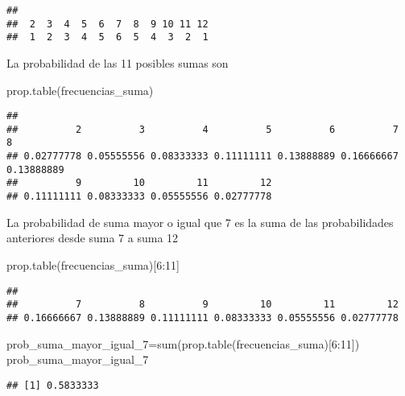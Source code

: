 \documentclass[
]{article}
\newenvironment{Shaded}{\begin{snugshade}}{\end{snugshade}}
\newcommand{\DecValTok}[1]{\textcolor[rgb]{0.00,0.00,0.81}{#1}}
\newcommand{\FunctionTok}[1]{\textcolor[rgb]{0.00,0.00,0.00}{#1}}
\newcommand{\NormalTok}[1]{#1}
\newcommand{\OtherTok}[1]{\textcolor[rgb]{0.56,0.35,0.01}{#1}}
\newcommand{\SpecialCharTok}[1]{\textcolor[rgb]{0.00,0.00,0.00}{#1}}
\begin{document}
\begin{verbatim}
## 
##  2  3  4  5  6  7  8  9 10 11 12 
##  1  2  3  4  5  6  5  4  3  2  1
\end{verbatim}

La probabilidad de las 11 posibles sumas son

\begin{Shaded}
\begin{Highlighting}[]
\FunctionTok{prop.table}\NormalTok{(frecuencias\_suma)}
\end{Highlighting}
\end{Shaded}

\begin{verbatim}
## 
##          2          3          4          5          6          7          8 
## 0.02777778 0.05555556 0.08333333 0.11111111 0.13888889 0.16666667 0.13888889 
##          9         10         11         12 
## 0.11111111 0.08333333 0.05555556 0.02777778
\end{verbatim}

La probabilidad de suma mayor o igual que 7 es la suma de las
probabilidades anteriores desde suma 7 a suma 12

\begin{Shaded}
\begin{Highlighting}[]
\FunctionTok{prop.table}\NormalTok{(frecuencias\_suma)[}\DecValTok{6}\SpecialCharTok{:}\DecValTok{11}\NormalTok{]}
\end{Highlighting}
\end{Shaded}

\begin{verbatim}
## 
##          7          8          9         10         11         12 
## 0.16666667 0.13888889 0.11111111 0.08333333 0.05555556 0.02777778
\end{verbatim}

\begin{Shaded}
\begin{Highlighting}[]
\NormalTok{prob\_suma\_mayor\_igual\_7}\OtherTok{=}\FunctionTok{sum}\NormalTok{(}\FunctionTok{prop.table}\NormalTok{(frecuencias\_suma)[}\DecValTok{6}\SpecialCharTok{:}\DecValTok{11}\NormalTok{])}
\NormalTok{prob\_suma\_mayor\_igual\_7}
\end{Highlighting}
\end{Shaded}

\begin{verbatim}
## [1] 0.5833333
\end{verbatim}

\begin{Shaded}
\end{Shaded}
\end{document}
